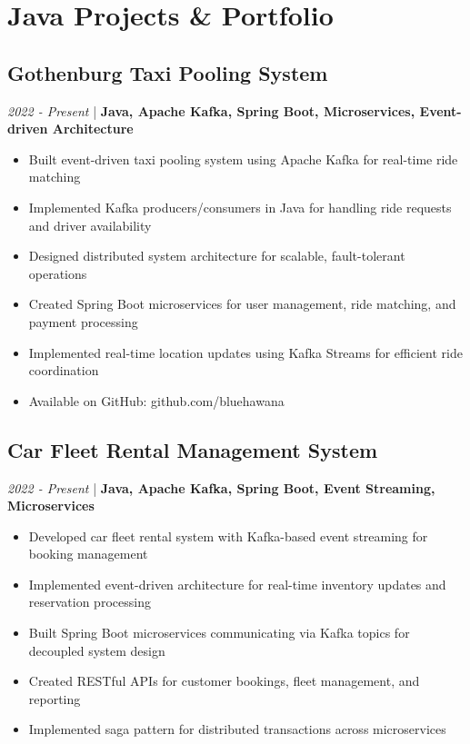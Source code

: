 \documentclass[11pt,a4paper]{article}
\begin{document}
\section*{Java Projects \& Portfolio}

\subsection*{Gothenburg Taxi Pooling System}
\textit{2022 - Present} | \textbf{Java, Apache Kafka, Spring Boot, Microservices, Event-driven Architecture}
\begin{itemize}[leftmargin=*, itemsep=1pt]
\item Built event-driven taxi pooling system using Apache Kafka for real-time ride matching
\item Implemented Kafka producers/consumers in Java for handling ride requests and driver availability
\item Designed distributed system architecture for scalable, fault-tolerant operations
\item Created Spring Boot microservices for user management, ride matching, and payment processing
\item Implemented real-time location updates using Kafka Streams for efficient ride coordination
\item Available on GitHub: github.com/bluehawana
\end{itemize}

\subsection*{Car Fleet Rental Management System}
\textit{2022 - Present} | \textbf{Java, Apache Kafka, Spring Boot, Event Streaming, Microservices}
\begin{itemize}[leftmargin=*, itemsep=1pt]
\item Developed car fleet rental system with Kafka-based event streaming for booking management
\item Implemented event-driven architecture for real-time inventory updates and reservation processing
\item Built Spring Boot microservices communicating via Kafka topics for decoupled system design
\item Created RESTful APIs for customer bookings, fleet management, and reporting
\item Implemented saga pattern for distributed transactions across microservices
\end{itemize}
\end{document}
